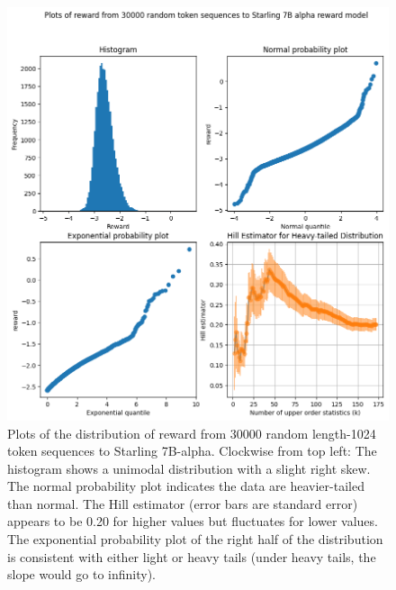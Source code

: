 \documentclass{article}
\begin{document}
\begin{figure}
    \centering
    \includegraphics[width=0.8\linewidth]{images/reward_plots_random_starling_30k_se.png}
    \caption{Plots of the distribution of reward from 30000 random length-1024 token sequences to Starling 7B-alpha. Clockwise from top left: The histogram shows a unimodal distribution with a slight right skew. The normal probability plot indicates the data are heavier-tailed than normal. The Hill estimator (error bars are standard error) appears to be 0.20 for higher values but fluctuates for lower values. The exponential probability plot of the right half of the distribution is consistent with either light or heavy tails (under heavy tails, the slope would go to infinity).}
    \label{fig:starling-random}
\end{figure}
\end{document}
